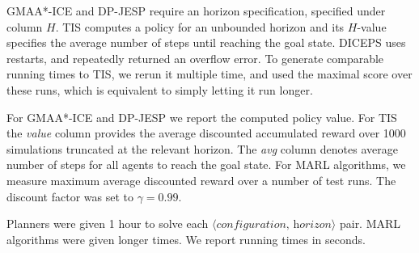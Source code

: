 \documentclass[runningheads]{llncs}
\begin{document}
GMAA*-ICE and DP-JESP require an horizon specification, specified 
under column $H$. TIS computes a policy for an unbounded horizon and its
$H$-value specifies the average number of steps until reaching the goal state.
 DICEPS uses restarts, and repeatedly returned an overflow error. To generate comparable running times to TIS, we rerun it multiple time, and used the maximal score over these runs, which is equivalent to simply letting it run longer. 

For GMAA*-ICE and DP-JESP we report the computed policy value. For TIS the {\em value} column provides the average discounted accumulated reward over 1000 simulations truncated at the relevant horizon. The {\em avg} column denotes average number of steps for all agents to reach the goal state.
For MARL algorithms, we measure maximum average discounted reward over a number of test runs.
The discount factor was set to $\gamma=0.99$.

Planners were given 1 hour to solve each $\langle\textit{configuration, horizon}\rangle$ pair. MARL algorithms were given longer times. We report running times in seconds.

\end{document}
